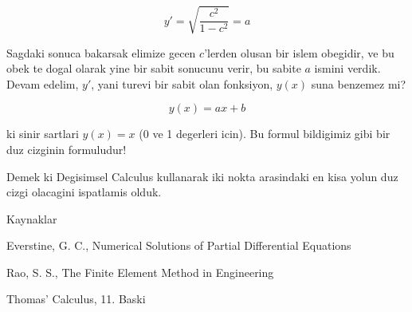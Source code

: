 \documentclass[12pt,fleqn]{article}\usepackage{../common}
\begin{document}
\[ y' = \sqrt{\frac{c^2}{1-c^2}} = a \]

Sagdaki sonuca bakarsak elimize gecen $c$'lerden olusan bir islem obegidir, ve
bu obek te dogal olarak yine bir sabit sonucunu verir, bu sabite $a$ ismini
verdik. Devam edelim, $y'$, yani turevi bir sabit olan fonksiyon, $y(x)$ suna
benzemez mi?

\[ y(x) = ax + b \]

ki sinir sartlari $y(x)=x$ (0 ve 1 degerleri icin). Bu formul bildigimiz
gibi bir duz cizginin formuludur! 

Demek ki Degisimsel Calculus kullanarak iki nokta arasindaki en kisa yolun duz
cizgi olacagini ispatlamis olduk.

Kaynaklar

Everstine, G. C., Numerical Solutions of Partial Differential Equations

Rao, S. S., The Finite Element Method in Engineering

Thomas' Calculus, 11. Baski
\end{document}

